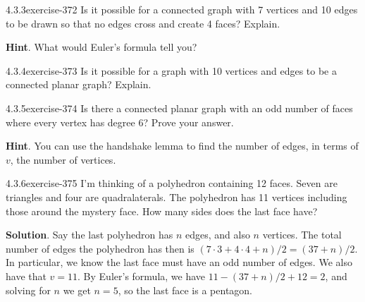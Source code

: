 \documentclass[twoside,11pt,]{book}
\numberwithin{equation}{chapter}
\begin{document}
\begin{divisionsolution}{4.3.3}{}{exercise-372}%
\hypertarget{p-4690}{}%
Is it possible for a connected graph with 7 vertices and 10 edges to be drawn so that no edges cross and create 4 faces?  Explain.%
\par\smallskip%
\noindent\textbf{Hint}.\quad%
\hypertarget{p-4691}{}%
What would Euler's formula tell you?%
\end{divisionsolution}%
\begin{divisionsolution}{4.3.4}{}{exercise-373}%
\hypertarget{p-4692}{}%
Is it possible for a graph with 10 vertices and edges to be a connected planar graph?  Explain.%
\end{divisionsolution}%
\begin{divisionsolution}{4.3.5}{}{exercise-374}%
\hypertarget{p-4693}{}%
Is there a connected planar graph with an odd number of faces where every vertex has degree 6?  Prove your answer.%
\par\smallskip%
\noindent\textbf{Hint}.\quad%
\hypertarget{p-4694}{}%
You can use the handshake lemma to find the number of edges, in terms of \(v\), the number of vertices.%
\end{divisionsolution}%
\begin{divisionsolution}{4.3.6}{}{exercise-375}%
\hypertarget{p-4695}{}%
I'm thinking of a polyhedron containing 12 faces. Seven are triangles and four are quadralaterals. The polyhedron has 11 vertices including those around the mystery face. How many sides does the last face have?%
\par\smallskip%
\noindent\textbf{Solution}.\quad%
\hypertarget{p-4696}{}%
Say the last polyhedron has \(n\) edges, and also \(n\) vertices. The total number of edges the polyhedron has then is \((7 \cdot 3 + 4 \cdot 4 + n)/2 = (37 + n)/2\). In particular, we know the last face must have an odd number of edges. We also have that \(v = 11 \). By Euler's formula, we have \(11 - (37+n)/2 + 12 = 2\), and solving for \(n\) we get \(n = 5\), so the last face is a pentagon.%
\end{divisionsolution}%
\end{document}
